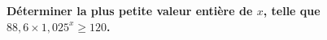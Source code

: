 \documentclass[french, 11pt]{article}
\begin{document}
{\large \textbf{ Déterminer la plus petite valeur entière de $x$, telle que $88,6 \times 1,025^x \geq 120$.}} 
\end{document}
